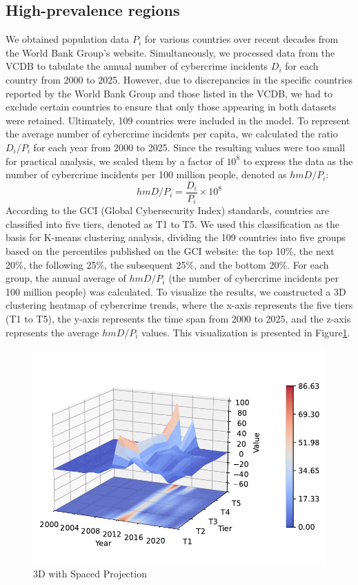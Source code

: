 \subsection{High-prevalence regions}\label{subsec:high-prevalence-regions} %
	We obtained population data $P_i$ for various countries over recent decades from the World Bank Group's website\cite{population}.
	Simultaneously, we processed data from the VCDB to tabulate the annual number of cybercrime incidents $D_i$ for each country from 2000 to 2025.
	However, due to discrepancies in the specific countries reported by the World Bank Group and those listed in the VCDB,
	we had to exclude certain countries to ensure that only those appearing in both datasets were retained.
	Ultimately, 109 countries were included in the model.
	To represent the average number of cybercrime incidents per capita,
	we calculated the ratio $D_i/P_i$ for each year from 2000 to 2025.
	Since the resulting values were too small for practical analysis,
	we scaled them by a factor of $10^{8}$ to express the data as the number of cybercrime incidents per 100 million people,
	denoted as $hmD/P_i$:
	\begin{equation}
		hmD/P_i = \frac{D_i}{P_i} \times 10^{8}\label{eq:3-2}
	\end{equation}
	According to the GCI (Global Cybersecurity Index) standards, countries are classified into five tiers, denoted as T1 to T5.
	We used this classification as the basis for K-means clustering analysis,
	dividing the 109 countries into five groups based on the percentiles published on the GCI website:
	the top 10\%, the next 20\%, the following 25\%, the subsequent 25\%, and the bottom 20\%.
	For each group, the annual average of $hmD/P_i$ (the number of cybercrime incidents per 100 million people) was calculated.
	To visualize the results, we constructed a 3D clustering heatmap of cybercrime trends,
	where the x-axis represents the five tiers (T1 to T5),
	the y-axis represents the time span from 2000 to 2025,
	and the z-axis represents the average $hmD/P_i$ values.
	This visualization is presented in Figure\ref{fig:3D_with_Spaced_Projection}.
	\begin{figure}[htbp]
		\centering
		\includegraphics[width=0.75\linewidth]{../rsrc/distributions/3D_with_Spaced_Projection}
		\caption{3D with Spaced Projection}\label{fig:3D_with_Spaced_Projection}
	\end{figure}
